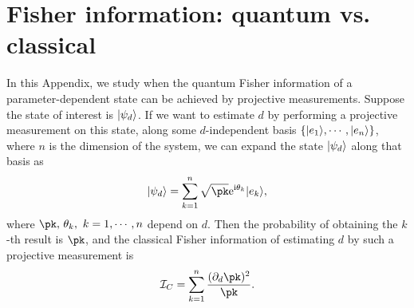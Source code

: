 \section{Fisher information: quantum vs. classical}

In this Appendix, we study when the quantum Fisher information of
a parameter-dependent state can be achieved by projective measurements.
Suppose the state of interest is $|\psi_{d}\rangle$. If we want to estimate $d$
by performing a projective measurement on this state, along some $d$-independent
basis $\{|e_{1}\rangle,\cdots,|e_{n}\rangle\}$, where $n$ is the dimension of
the system, we can expand the state $|\psi_{d}\rangle$ along that basis as
\begin{equation}
\kd=\sk\sqrt{\pk}\et\bas k,\label{eq:state sd}
\end{equation}
where $\pk,\,\tk,\,\,k=1,\cdots,n$ depend on $d$. Then the probability
of obtaining the $k$-th result is $\pk$, and the classical Fisher
information of estimating $d$ by such a projective measurement is
\begin{equation}
\ic=\sk\frac{(\pd\pk)^{2}}{\pk}.\label{eq:cfi}
\end{equation}


